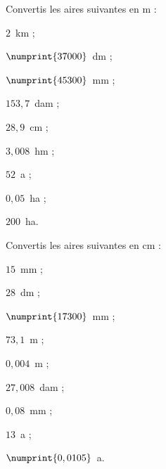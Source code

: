 \begin{exercice}
Convertis les aires suivantes en m :
\begin{colenumerate}{3}
 \item $2$ km ;
 \item $\numprint{37000}$ dm ;
 \item $\numprint{45300}$ mm ;
 \item $153,7$ dam ;
 \item $28,9$ cm ;
 \item $3,008$ hm ;
 \item $52$ a ;
 \item $0,05$ ha ;
 \item $200$ ha.
 \end{colenumerate}
\end{exercice}


\begin{exercice}
Convertis les aires suivantes en cm :
\begin{colenumerate}{3}
 \item $15$ mm ;
 \item $28$ dm ;
 \item $\numprint{17300}$ mm ;
 \item $73,1$ m ;
 \item $0,004$ m ;
 \item $27,008$ dam ;
 \item $0,08$ mm ;
 \item $13$ a ;
 \item $\numprint{0,0105}$ a.
 \end{colenumerate}
\end{exercice}



\columnbreak



